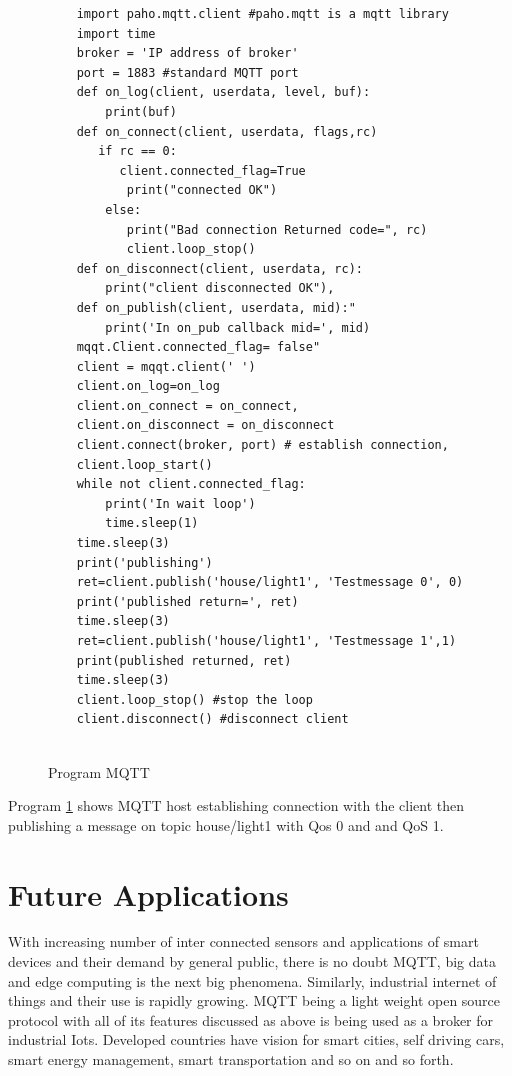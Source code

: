 \documentclass[sigconf]{acmart}
\begin{document}
\begin{figure}[htb]

\begin{verbatim}
    import paho.mqtt.client #paho.mqtt is a mqtt library
    import time
    broker = 'IP address of broker'
    port = 1883 #standard MQTT port
    def on_log(client, userdata, level, buf):
        print(buf)
    def on_connect(client, userdata, flags,rc)
       if rc == 0:
          client.connected_flag=True 
           print("connected OK")
        else:
           print("Bad connection Returned code=", rc)
           client.loop_stop()
    def on_disconnect(client, userdata, rc):
        print("client disconnected OK"),
    def on_publish(client, userdata, mid):"
        print('In on_pub callback mid=', mid)
    mqqt.Client.connected_flag= false"
    client = mqqt.client(' ')
    client.on_log=on_log
    client.on_connect = on_connect,
    client.on_disconnect = on_disconnect
    client.connect(broker, port) # establish connection,
    client.loop_start()
    while not client.connected_flag:
        print('In wait loop')
        time.sleep(1)
    time.sleep(3)
    print('publishing')
    ret=client.publish('house/light1', 'Testmessage 0', 0)
    print('published return=', ret)
    time.sleep(3)
    ret=client.publish('house/light1', 'Testmessage 1',1)
    print(published returned, ret)
    time.sleep(3)
    client.loop_stop() #stop the loop
    client.disconnect() #disconnect client


\end{verbatim}
\caption{Program MQTT}\label{p:MQTT}
\end{figure}

Program \ref{p:MQTT} shows MQTT host establishing connection with the client then publishing a message on topic house/light1 with Qos 0 and and QoS 1.



\section{Future Applications}
With increasing number of inter connected sensors and applications of smart devices and their demand by general public, there is no doubt MQTT, big data and edge computing is the next big phenomena. Similarly, industrial internet of things and their use is rapidly growing. MQTT being a light weight open source protocol with all of its features discussed as above is being used as a broker for industrial Iots. Developed countries have vision for smart cities, self driving cars, smart energy management, smart transportation  and so on and so forth.    
\end{document}
